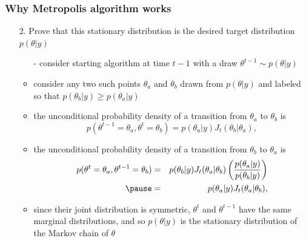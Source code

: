 \documentclass[10pt]{beamer}
\begin{document}
\begin{frame}

\frametitle{ Why Metropolis algorithm works}

  \begin{itemize}
  \item[2.] Prove that this stationary distribution is the desired target distribution $p(\theta|y)$
    \begin{itemize}
    \item[-] consider starting algorithm at time $t-1$ with a draw
      $\theta^{t-1} \sim p(\theta|y)$
    \item<2->[-] consider any two such points $\theta_a$ and $\theta_b$ drawn
      from $p(\theta|y)$ and labeled so that
      $p(\theta_b|y)\geq p(\theta_a|y)$
    \item<3->[-] the unconditional probability density of a transition from $\theta_a$ to $\theta_b$ is
      \vspace{-0.5\baselineskip}
      \begin{equation*}
        p(\theta^{t-1}=\theta_a,\theta^{t}=\theta_b)=
        p(\theta_a|y)J_t(\theta_b|\theta_a),
      \end{equation*}
      \vspace{-1\baselineskip}
    \item<4->[-] the unconditional probability density of a transition from $\theta_b$ to $\theta_a$ is
      \vspace{-0.5\baselineskip}
      \begin{eqnarray*}
        p(\theta^{t}=\theta_a,\theta^{t-1}=\theta_b) & = &
        p(\theta_b|y)J_t(\theta_a|\theta_b)\left(\frac{p(\theta_a|y)}{p(\theta_b|y)}\right)\\
        \pause &  = &  p(\theta_a|y)J_t(\theta_a|\theta_b),
      \end{eqnarray*}
      \pause
    \item<6->[-] since their joint distribution is symmetric, $\theta^t$ and
      $\theta^{t-1}$ have the same marginal distributions, and so
      $p(\theta|y)$ is the stationary distribution of the Markov chain of $\theta$
    \end{itemize}
  \end{itemize}

\end{frame}
\end{document}
